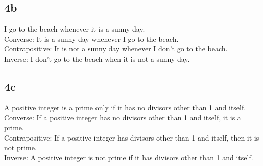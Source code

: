 \documentclass[letterpaper, 12pt]{math}
\begin{document}
\subsection*{4b}
I go to the beach whenever it is a sunny day. \\
Converse: It is a sunny day whenever I go to the beach. \\
Contrapositive: It is not a sunny day whenever I don't go to the beach. \\
Inverse: I don't go to the beach when it is not a sunny day.

\subsection*{4c}
A positive integer is a prime only if it has no divisors other than 1 and
itself. \\
Converse: If a positive integer has no divisors other than 1 and itself, it is
a prime. \\
Contrapositive: If a positive integer has divisors other than 1 and itself,
then it is not prime. \\
Inverse: A positive integer is not prime if it has divisors other than 1 and
itself.
\end{document}
